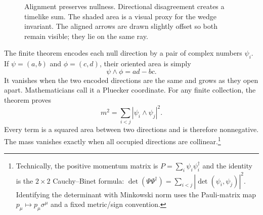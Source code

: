 \documentclass[11pt]{article}
\begin{document}
\begin{figure}[ht]
\centering
{}
\caption{Alignment preserves nullness.  Directional disagreement creates a
timelike sum.  The shaded area is a visual proxy for the wedge invariant.
The aligned arrows are drawn slightly offset so both remain visible; they lie
on the same ray.}
\label{fig:aperture}
\end{figure}

The finite theorem encodes each null direction by a pair of complex numbers
$\psi_i$.  If $\psi=(a,b)$ and $\phi=(c,d)$, their oriented area is simply
\[
  \psi\wedge\phi=ad-bc.
\]
It vanishes when the two encoded directions are the same and grows as they
open apart.  Mathematicians call it a Pluecker coordinate.  For any finite
collection, the theorem proves
\[
  m^2=\sum_{i<j}|\psi_i\wedge\psi_j|^2.
\]
Every term is a squared area between two directions and is therefore
nonnegative.  The mass vanishes exactly when all occupied directions are
collinear.\footnote{Technically, the positive momentum matrix is
$P=\sum_i\psi_i\psi_i^\dagger$ and the identity is the $2\times2$ Cauchy--Binet formula:
$\det(\Psi\Psi^\dagger)=\sum_{i<j}|\det(\psi_i,\psi_j)|^2$.  Identifying the
determinant with Minkowski norm uses the Pauli-matrix map
$p_\mu\mapsto p_\mu\sigma^\mu$ and a fixed metric/sign convention.}
\end{document}
